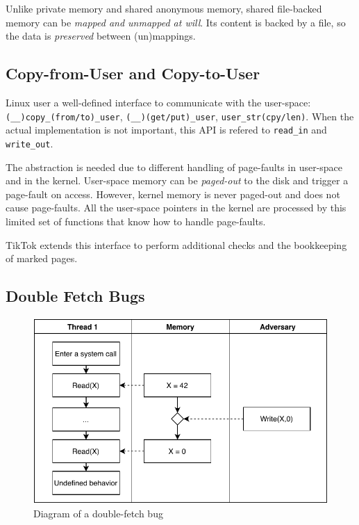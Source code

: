 \documentclass[conference]{IEEEtran}
\newcommand{\sysname}{TikTok}
\begin{document}
Unlike private memory and shared anonymous memory, shared file-backed memory can
be \emph{mapped and unmapped at will}. Its content is backed by a file, so the
data is \emph{preserved} between (un)mappings.

\subsection{Copy-from-User and Copy-to-User}
\label{subsec:copy}

Linux user a well-defined interface to communicate with the user-space:
\texttt{(\_\_)copy\_(from/to)\_user}, \texttt{(\_\_)(get/put)\_user},
\texttt{user\_str(cpy/len)}. When the actual implementation is not important,
this API is refered to \texttt{read\_in} and \texttt{write\_out}.

The abstraction is needed due to different handling of page-faults in user-space
and in the kernel. User-space memory can be \emph{paged-out} to the disk and
trigger a page-fault on access. However, kernel memory is never paged-out and
does not cause page-faults. All the user-space pointers in the kernel are
processed by this limited set of functions that know how to handle page-faults.

\sysname{} extends this interface to perform additional checks and the bookkeeping
of marked pages.

\subsection{Double Fetch Bugs}
\label{subsec:doublefetch}

\begin{figure}[]
  \centering
  \includegraphics[width=.85\linewidth]{img/doublefetch.pdf}
  \caption{Diagram of a double-fetch bug}
  \label{fig:doublefetch}
\end{figure}
\end{document}

